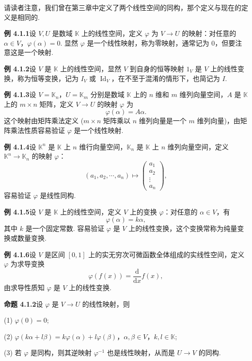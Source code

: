 \documentclass[UTF8,12pt,a4paper,fontset=fandol]{ctexart}
\begin{document}
请读者注意，我们曾在第三章中定义了两个线性空间的同构，那个定义与现在的定义是相同的.

\noindent\textbf{例 4.1.1}\quad 设 $V,U$ 是数域 $\mathbb{K}$ 上的线性空间，定义 $\varphi$ 为 $V\to U$ 的映射：对任意的 $\alpha\in V$，$\varphi(\alpha)=0$. 显然 $\varphi$ 是一个线性映射，称为零映射，通常记为 0，但要注意这是一个映射.

\noindent\textbf{例 4.1.2}\quad 设 $V$ 是 $\mathbb{K}$ 上的线性空间，显然 $V$ 到自身的恒等映射 $1_V$ 是 $V$ 上的线性变换，称为恒等变换，记为 $I_V$ 或 $\operatorname{Id}_V$，在不至于混淆的情形下，也简记为 $I$.

\noindent\textbf{例 4.1.3}\quad 设 $V=\mathbb{K}_n$，$U=\mathbb{K}_m$ 分别是数域 $\mathbb{K}$ 上的 $n$ 维和 $m$ 维列向量空间，$A$ 是 $\mathbb{K}$ 上的 $m\times n$ 矩阵，定义 $V\to U$ 的映射 $\varphi$ 为
\[
\varphi(\alpha)=A\alpha.
\]
这个映射由矩阵乘法定义 ($m\times n$ 矩阵乘以 $n$ 维列向量是一个 $m$ 维列向量)，由矩阵乘法性质容易验证 $\varphi$ 是一个线性映射.

\noindent\textbf{例 4.1.4}\quad 设 $\mathbb{K}^n$ 是 $\mathbb{K}$ 上 $n$ 维行向量空间，$\mathbb{K}_n$ 是 $\mathbb{K}$ 上 $n$ 维列向量空间，定义 $\mathbb{K}^n\to\mathbb{K}_n$ 的映射 $\varphi$：
\[
(a_1,a_2,\cdots,a_n)\mapsto
\left(\begin{array}{c}
a_1\\
a_2\\
\vdots\\
a_n
\end{array}\right),
\]
容易验证 $\varphi$ 是线性同构.

\noindent\textbf{例 4.1.5}\quad 设 $V$ 是 $\mathbb{K}$ 上的线性空间，定义 $V$ 上的变换 $\varphi$：对任意的 $\alpha\in V$，有
\[
\varphi(\alpha)=k\alpha,
\]
其中 $k$ 是一个固定常数. 容易验证 $\varphi$ 是 $V$ 上的线性变换，这个变换常称为纯量变换或数量变换.

\noindent\textbf{例 4.1.6}\quad 设 $V$ 是区间 $[0,1]$ 上的实无穷次可微函数全体组成的实线性空间，定义 $\varphi$ 为求导变换
\[
\varphi(f(x))=\frac{\mathrm{d}}{\mathrm{d}x}f(x),
\]
由求导性质知 $\varphi$ 是 $V$ 上的线性变换.

\noindent\textbf{命题 4.1.2}\quad 设 $\varphi$ 是 $V\to U$ 的线性映射，则

(1) $\varphi(0)=0$;

(2) $\varphi(k\alpha+l\beta)=k\varphi(\alpha)+l\varphi(\beta)$，$\alpha,\beta\in V$，$k,l\in\mathbb{K}$;

(3) 若 $\varphi$ 是同构，则其逆映射 $\varphi^{-1}$ 也是线性映射，从而是 $U\to V$ 的同构.
\end{document}
